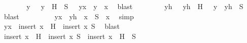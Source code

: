 \begin{isabellebody}
\ \ \ \ \isamarkupfalse%
\ \isamarkupfalse%
\ y\ \ {}{\isacharcolon}{\kern0pt}\ {\isachardoublequoteopen}y\ {\isasymin}\ {\isacharparenleft}{\kern0pt}H\ {\isasyminter}{\isacharasterisk}{\kern0pt}\ S{\isacharparenright}{\kern0pt}{\isachardoublequoteclose}\ \ {}{\isacharcolon}{\kern0pt}\ {\isachardoublequoteopen}y{\isacharunderscore}{\kern0pt}x\ {\isacharequal}{\kern0pt}\ y\ {\isasymunion}\ {\isacharbraceleft}{\kern0pt}x{\isacharbraceright}{\kern0pt}{\isachardoublequoteclose}\ \isamarkupfalse%
\ blast\isanewline
\ \ \ \ \isamarkupfalse%
\ {}\ \isamarkupfalse%
\ yh\ \ {}{\isacharcolon}{\kern0pt}\ {\isachardoublequoteopen}yh\ {\isasymin}\ H{\isachardoublequoteclose}\ \ {}{\isacharcolon}{\kern0pt}\ {\isachardoublequoteopen}y\ {\isacharequal}{\kern0pt}\ yh\ {\isasyminter}\ S{\isachardoublequoteclose}\ \isamarkupfalse%
\ blast\isanewline
\ \ \ \ \isamarkupfalse%
\ {}\ {}\ \isamarkupfalse%
\ {\isachardoublequoteopen}y{\isacharunderscore}{\kern0pt}x\ {\isacharequal}{\kern0pt}\ {\isacharparenleft}{\kern0pt}yh\ {\isasymunion}\ {\isacharbraceleft}{\kern0pt}x{\isacharbraceright}{\kern0pt}{\isacharparenright}{\kern0pt}\ {\isasyminter}\ {\isacharparenleft}{\kern0pt}S\ {\isasymunion}\ {\isacharbraceleft}{\kern0pt}x{\isacharbraceright}{\kern0pt}{\isacharparenright}{\kern0pt}{\isachardoublequoteclose}\ \isamarkupfalse%
\ simp\isanewline
\ \ \ \ \isamarkupfalse%
\ {}\ \isamarkupfalse%
\ {\isachardoublequoteopen}y{\isacharunderscore}{\kern0pt}x\ {\isasymin}\ {\isacharparenleft}{\kern0pt}insert\ x\ {\isacharbackquote}{\kern0pt}\ H{\isacharparenright}{\kern0pt}\ {\isasyminter}{\isacharasterisk}{\kern0pt}\ {\isacharparenleft}{\kern0pt}insert\ x\ S{\isacharparenright}{\kern0pt}{\isachardoublequoteclose}\ \isamarkupfalse%
\ blast\isanewline
\ \ \isamarkupfalse%
\isanewline
{}\isamarkupfalse%
\isanewline
\ \ \isamarkupfalse%
\ {\isachardoublequoteopen}insert\ x\ {\isacharbackquote}{\kern0pt}\ H\ {\isasyminter}{\isacharasterisk}{\kern0pt}\ {\isacharparenleft}{\kern0pt}insert\ x\ S{\isacharparenright}{\kern0pt}\ {\isasymsubseteq}\ insert\ x\ {\isacharbackquote}{\kern0pt}\ {\isacharparenleft}{\kern0pt}H\ {\isasyminter}{\isacharasterisk}{\kern0pt}\ S{\isacharparenright}{\kern0pt}{\isachardoublequoteclose}\isanewline

\end{isabellebody}
